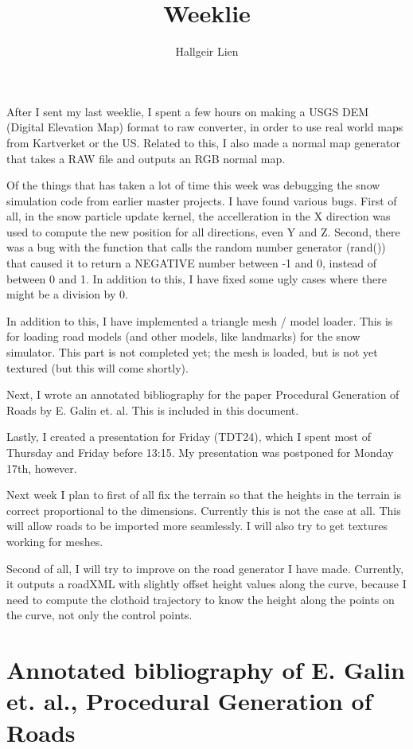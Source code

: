 \documentclass{article}
\title{Weeklie}
\author{Hallgeir Lien}
\begin{document}
\maketitle

After I sent my last weeklie, I spent a few hours on making a USGS DEM (Digital Elevation Map) format to raw converter, in order to use real world maps from Kartverket or the US. Related to this, I also made a normal map generator that takes a RAW file and outputs an RGB normal map.

Of the things that has taken a lot of time this week was debugging the snow simulation code from earlier master projects. I have found various bugs. First of all, in the snow particle update kernel, the accelleration in the X direction was used to compute the new position for all directions, even Y and Z. Second, there was a bug with the function that calls the random number generator (rand()) that caused it to return a NEGATIVE number between -1 and 0, instead of between 0 and 1. In addition to this, I have fixed some ugly cases where there might be a division by 0.

In addition to this, I have implemented a triangle mesh / model loader. This is for loading road models (and other models, like landmarks) for the snow simulator. This part is not completed yet; the mesh is loaded, but is not yet textured (but this will come shortly).

Next, I wrote an annotated bibliography for the paper Procedural Generation of Roads by E. Galin et. al. This is included in this document. 

Lastly, I created a presentation for Friday (TDT24), which I spent most of Thursday and Friday before 13:15. My presentation was postponed for Monday 17th, however.

Next week I plan to first of all fix the terrain so that the heights in the terrain is correct proportional to the dimensions. Currently this is not the case at all. This will allow roads to be imported more seamlessly. I will also try to get textures working for meshes.

Second of all, I will try to improve on the road generator I have made. Currently, it outputs a roadXML with slightly offset height values along the curve, because I need to compute the clothoid trajectory to know the height along the points on the curve, not only the control points.

\appendix
\section{Annotated bibliography of E. Galin et. al., Procedural Generation of Roads}

\end{document}
